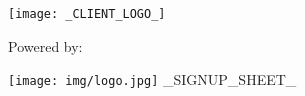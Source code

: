 \texttt{[image: \_CLIENT\_LOGO\_]}

\vspace{100px}

\centerline{\huge Powered by:}
\texttt{[image: img/logo.jpg]}
_SIGNUP_SHEET_
\newpage
